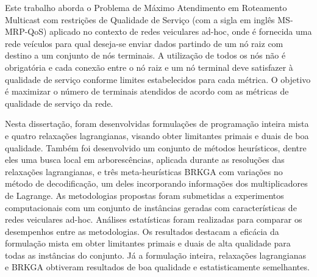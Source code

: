 \documentclass[Portugues]{ic-tese-v3}
\theoremstyle{definition}
\theoremstyle{proposition}
\begin{document}


\begin{resumo}

Este trabalho  aborda o Problema  de Máximo Atendimento em  Roteamento Multicast
com  restrições de  Qualidade  de Serviço  (com a  sigla  em inglês  MS-MRP-QoS)
aplicado  no contexto  de redes  veiculares ad-hoc,  onde é  fornecida uma  rede
veículos para qual deseja-se  enviar dados partindo de um nó  raiz com destino a
um conjunto de nós  terminais. A utilização de todos os nós  não é obrigatória e
cada conexão  entre o nó raiz  e um nó  terminal deve satisfazer à  qualidade de
serviço conforme limites estabelecidos para cada métrica. O objetivo é maximizar
o  número de  terminais atendidos  de  acordo com  as métricas  de qualidade  de
serviço da rede.

Nesta dissertação, foram desenvolvidas  formulações de programação inteira mista
e quatro  relaxações lagrangianas, visando  obter limitantes primais e  duais de
boa  qualidade. Também  foi  desenvolvido um  conjunto  de métodos  heurísticos,
dentre eles  uma busca local  em arborescências, aplicada durante  as resoluções
das  relaxações lagrangianas,  e três  meta-heurísticas BRKGA  com variações  no
método de  decodificação, um deles incorporando  informações dos multiplicadores
de  Lagrange.   As  metodologias  propostas  foram   submetidas  a  experimentos
computacionais  com um  conjunto de  instâncias geradas  com características  de
redes veiculares ad-hoc. Análises estatísticas foram realizadas para comparar os
desempenhos  entre  as  metodologias.  Os  resultados  destacam  a  eficácia  da
formulação mista  em obter  limitantes primais  e duais  de alta  qualidade para
todas  as   instâncias  do  conjunto.   Já  a  formulação   inteira,  relaxações
lagrangianas e  BRKGA obtiveram resultados  de boa qualidade  e estatisticamente
semelhantes.

  


\end{resumo}
\end{document}
